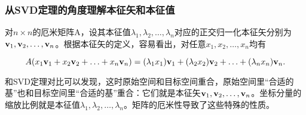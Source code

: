 \documentclass[CJK,13pt]{beamer}
\begin{document}
\begin{frame}
  \frametitle{从SVD定理的角度理解本征矢和本征值}
  对$n\times n$的厄米矩阵A，设其本征值$\lambda_1,\lambda_2, \ldots, \lambda_n$对应的正交归一化本征矢分别为${\mathbf{v}}_1,{\mathbf{v}}_2,\ldots,{\mathbf{v}}_n$。根据本征矢的定义，容易看出，对任意$x_1,x_2,\ldots, x_n$均有

  $$A(x_1{\mathbf{v}}_1+x_2{\mathbf{v}}_2+\ldots+x_n{\mathbf{v}}_n) = (\lambda_1x_1){\mathbf{v}}_1+(\lambda_2x_2){\mathbf{v}}_2+\ldots+(\lambda_nx_n){\mathbf{v}}_n.$$

  
  和SVD定理对比可以发现，这时原始空间和目标空间重合，原始空间里“合适的基”也和目标空间里“合适的基”重合：它们就是本征矢${\mathbf{v}}_1,{\mathbf{v}}_2,\ldots,{\mathbf{v}}_n$。坐标分量的缩放比例就是本征值$\lambda_1,\lambda_2, \ldots, \lambda_n$。矩阵的厄米性导致了这些特殊的性质。
 
\end{frame}


\ech
\end{document}
